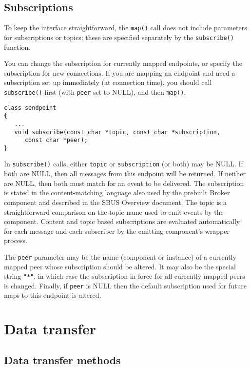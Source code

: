 \documentclass[12pt,a4paper,twoside]{article}
\renewcommand{\_}{\texttt{\symbol{95}}}
\begin{document}
\subsection{Subscriptions}

To keep the interface straightforward, the \verb^map()^ call does not
include parameters for subscriptions or topics; these are
specified separately by the \verb^subscribe()^ function.

You can change the subscription for currently mapped endpoints,
or specify the subscription for new connections. If you are
mapping an endpoint and need a subscription set up immediately
(at connection time), you should call \verb^subscribe()^ first
(with \verb^peer^ set to NULL), and then \verb^map()^.

\begin{verbatim}
class sendpoint
{
   ...
   void subscribe(const char *topic, const char *subscription,
      const char *peer);
}
\end{verbatim}

In \verb^subscribe()^ calls, either \verb^topic^ or \verb^subscription^
(or both) may be NULL. If both are NULL, then all messages from this
endpoint will be returned. If neither are NULL, then both must match
for an event to be delivered. The subscription is stated in the
content-matching language also used by the prebuilt Broker component
and described in the SBUS Overview document.
The topic is a straightforward comparison on the topic name used to emit
events by the component. Content and topic based subscriptions are evaluated
automatically for each message and each subscriber by the emitting
component's wrapper process.

The \verb^peer^ parameter may be the name (component or instance)
of a currently mapped peer whose subscription should be altered.
It may also be the special string \verb^"*"^, in which case
the subscription in force for all currently mapped peers is changed.
Finally, if \verb^peer^ is NULL then the default subscription
used for future maps to this endpoint is altered.

\section{Data transfer}

\subsection{Data transfer methods}
\end{document}

